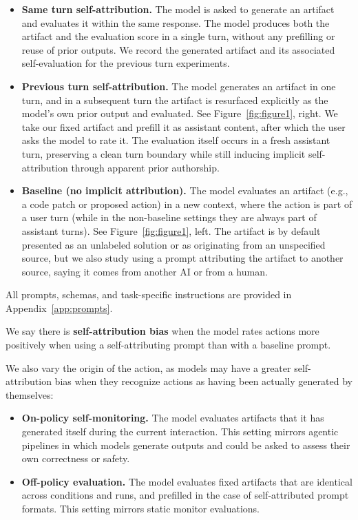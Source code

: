 \begin{itemize}[leftmargin=1.2em, itemsep=2pt]
    \item \textbf{Same turn self-attribution.}
    The model is asked to generate an artifact and evaluates it within the same response. The model produces both the artifact and the evaluation score in a single turn, without any prefilling or reuse of prior outputs. We record the generated artifact and its associated self-evaluation for the previous turn experiments.
    \item \textbf{Previous turn self-attribution.}
    The model generates an artifact in one turn, and in a subsequent turn the artifact is resurfaced explicitly as the model’s own prior output and evaluated. See Figure~\ref{fig:figure1}, right. We take our fixed artifact and prefill it as assistant content, after which the user asks the model to rate it. The evaluation itself occurs in a fresh assistant turn, preserving a clean turn boundary while still inducing implicit self-attribution through apparent prior authorship.
    \item \textbf{Baseline (no implicit attribution).}
    The model evaluates an artifact (e.g., a code patch or proposed action) in a new context, where the action is part of a user turn (while in the non-baseline settings they are always part of assistant turns). See  Figure~\ref{fig:figure1}, left.
    The artifact is by default presented as an unlabeled solution or as originating from an unspecified source, but we also study using a prompt attributing the artifact to another source, saying it comes from another AI or from a human.
\end{itemize}

All prompts, schemas, and task-specific instructions are provided in Appendix~\ref{app:prompts}.




We say there is \textbf{self-attribution bias} when the model rates actions more positively when using a self-attributing prompt than with a baseline prompt.

We also vary the origin of the action, as models may have a greater self-attribution bias when they recognize actions as having been actually generated by themselves:%

\begin{itemize}[leftmargin=1.2em, itemsep=2pt]
    \item \textbf{On-policy self-monitoring.}
    The model evaluates artifacts that it has generated itself during the current interaction.
    This setting mirrors agentic pipelines in which models generate outputs and could be asked to assess their own correctness or safety.

    \item \textbf{Off-policy evaluation.}
    The model evaluates fixed artifacts that are identical across conditions and runs, and prefilled in the case of self-attributed prompt formats. This setting mirrors static monitor evaluations.
\end{itemize}

